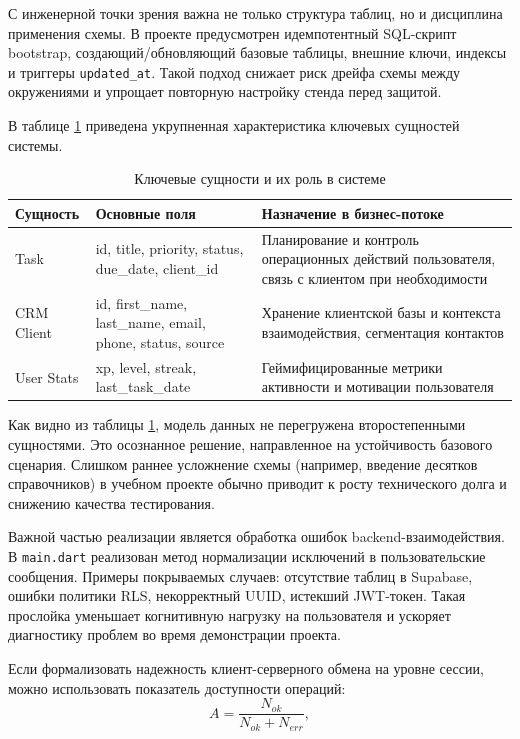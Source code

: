 С инженерной точки зрения важна не только структура таблиц, но и дисциплина применения схемы. В проекте предусмотрен идемпотентный SQL-скрипт bootstrap, создающий/обновляющий базовые таблицы, внешние ключи, индексы и триггеры \texttt{updated\_at}. Такой подход снижает риск дрейфа схемы между окружениями и упрощает повторную настройку стенда перед защитой.

В таблице \ref{tab:data-model} приведена укрупненная характеристика ключевых сущностей системы.

\begin{table}[h!]
\caption{Ключевые сущности и их роль в системе}
\centering
\begin{tabular}{|p{3.5cm}|p{5.2cm}|p{5.5cm}|}
\hline
\textbf{Сущность} & \textbf{Основные поля} & \textbf{Назначение в бизнес-потоке} \\
\hline
Task & id, title, priority, status, due\_date, client\_id & Планирование и контроль операционных действий пользователя, связь с клиентом при необходимости \\
\hline
CRM Client & id, first\_name, last\_name, email, phone, status, source & Хранение клиентской базы и контекста взаимодействия, сегментация контактов \\
\hline
User Stats & xp, level, streak, last\_task\_date & Геймифицированные метрики активности и мотивации пользователя \\
\hline
\end{tabular}
\label{tab:data-model}
\end{table}

Как видно из таблицы \ref{tab:data-model}, модель данных не перегружена второстепенными сущностями. Это осознанное решение, направленное на устойчивость базового сценария. Слишком раннее усложнение схемы (например, введение десятков справочников) в учебном проекте обычно приводит к росту технического долга и снижению качества тестирования.

Важной частью реализации является обработка ошибок backend-взаимодействия. В \texttt{main.dart} реализован метод нормализации исключений в пользовательские сообщения. Примеры покрываемых случаев: отсутствие таблиц в Supabase, ошибки политики RLS, некорректный UUID, истекший JWT-токен. Такая прослойка уменьшает когнитивную нагрузку на пользователя и ускоряет диагностику проблем во время демонстрации проекта.

Если формализовать надежность клиент-серверного обмена на уровне сессии, можно использовать показатель доступности операций:
\begin{equation}
A = \frac{N_{ok}}{N_{ok} + N_{err}},
\label{eq:availability}
\end{equation}

